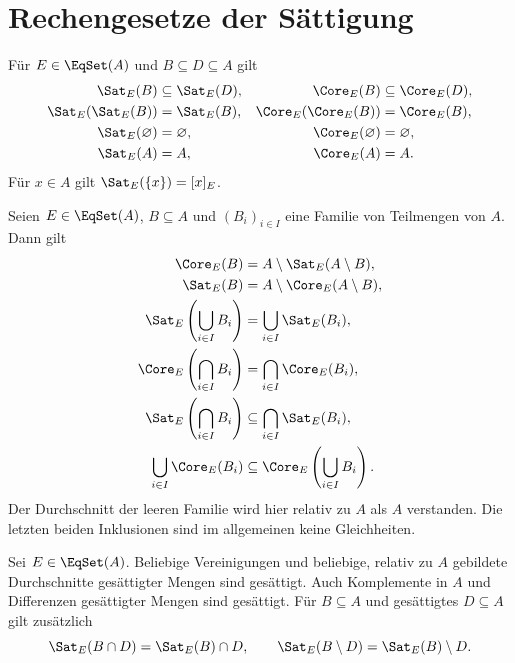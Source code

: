 \section{Rechengesetze der Sättigung}

\begin{theorem}
Für $E\in\EqSet(A)$ und $B\subseteq D\subseteq A$ gilt
\[
\begin{aligned}
 \Sat_E(B)&\subseteq\Sat_E(D),&
 \Core_E(B)&\subseteq\Core_E(D),\\
 \Sat_E(\Sat_E(B))&=\Sat_E(B),&
 \Core_E(\Core_E(B))&=\Core_E(B),\\
 \Sat_E(\varnothing)&=\varnothing,&
 \Core_E(\varnothing)&=\varnothing,\\
 \Sat_E(A)&=A,& \Core_E(A)&=A.
\end{aligned}
\]
Für $x\in A$ gilt $\Sat_E(\{x\})=[x]_E$.
\end{theorem}

\begin{theorem}
\label{b11guide:thm:satlaws}
Seien $E\in\EqSet(A)$, $B\subseteq A$ und
$(B_i)_{i\in I}$ eine Familie von Teilmengen von $A$. Dann gilt
\[
\begin{aligned}
 \Core_E(B)&=A\setminus\Sat_E(A\setminus B),\\
 \Sat_E(B)&=A\setminus\Core_E(A\setminus B),\\
 \Sat_E\left(\bigcup_{i\in I}B_i\right)
       &=\bigcup_{i\in I}\Sat_E(B_i),\\
 \Core_E\left(\bigcap_{i\in I}B_i\right)
       &=\bigcap_{i\in I}\Core_E(B_i),\\
 \Sat_E\left(\bigcap_{i\in I}B_i\right)
       &\subseteq\bigcap_{i\in I}\Sat_E(B_i),\\
 \bigcup_{i\in I}\Core_E(B_i)
       &\subseteq\Core_E\left(\bigcup_{i\in I}B_i\right).
\end{aligned}
\]
Der Durchschnitt der leeren Familie wird hier relativ zu $A$
als $A$ verstanden. Die letzten beiden Inklusionen sind im
allgemeinen keine Gleichheiten.
\end{theorem}

\begin{theorem}
Sei $E\in\EqSet(A)$.
Beliebige Vereinigungen und beliebige, relativ zu $A$ gebildete
Durchschnitte gesättigter Mengen sind gesättigt.
Auch Komplemente in $A$ und Differenzen gesättigter Mengen
sind gesättigt. Für $B\subseteq A$ und gesättigtes $D\subseteq A$
gilt zusätzlich
\[
 \Sat_E(B\cap D)=\Sat_E(B)\cap D,\qquad
 \Sat_E(B\setminus D)=\Sat_E(B)\setminus D.
\]
\end{theorem}

